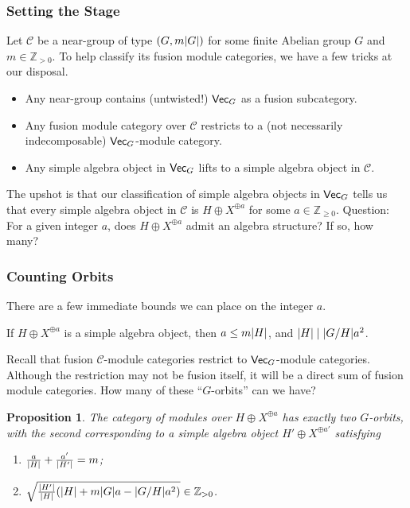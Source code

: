 \documentclass{beamer}
\theoremstyle{plain}
\newtheorem{proposition}[theorem]{Proposition}
\theoremstyle{definition}
\DeclarePairedDelimiter{\abs}{\lvert}{\rvert}
\newcommand{\mathcat}[1]{\mathcal{#1}}
\newcommand{\textcat}[1]{\textup{\textsf{#1}}}
\begin{document}
\begin{frame}
\frametitle{Setting the Stage}
Let $\mathcat{C}$ be a near-group of type $(G, m\abs{G})$ for some finite Abelian group $G$ and $m \in \mathbb{Z}_{>0}$. To help classify its fusion module categories, we have a few tricks at our disposal.
\medskip
\begin{itemize}
	\item Any near-group contains (untwisted!) $\textcat{Vec}_G$ as a fusion subcategory.
	\item Any fusion module category over $\mathcat{C}$ restricts to a (not necessarily indecomposable) $\textcat{Vec}_G$-module category.
	\item Any simple algebra object in $\textcat{Vec}_G$ lifts to a simple algebra object in $\mathcat{C}$.
\end{itemize}
\medskip
The upshot is that our classification of simple algebra objects in $\textcat{Vec}_G$ tells us that every simple algebra object in $\mathcat{C}$ is $H \oplus X^{\oplus a}$ for some $a \in \mathbb{Z}_{\geq 0}$.%
\newline\newline
Question: For a given integer $a$, does $H \oplus X^{\oplus a}$ admit an algebra structure? If so, how many?
\end{frame}

\begin{frame}
\frametitle{Counting Orbits}
There are a few immediate bounds we can place on the integer $a$.
\begin{lemma}
If $H \oplus X^{\oplus a}$ is a simple algebra object, then $a \leq m\abs{H}$, and $\abs{H} \mid \abs{G/H}a^2$.
\end{lemma}
Recall that fusion $\mathcat{C}$-module categories restrict to $\textcat{Vec}_G$-module categories. Although the restriction may not be fusion itself, it will be a direct sum of fusion module categories. How many of these ``$G$-orbits'' can we have?
\begin{proposition}
The category of modules over $H \oplus X^{\oplus a}$ has exactly two $G$-orbits, with the second corresponding to a simple algebra object $H' \oplus X^{\oplus a'}$ satisfying
\begin{enumerate}
\item $\frac{a}{\abs{H}} + \frac{a'}{\abs{H'}} = m$;
\item $\sqrt{\frac{\abs{H'}}{\abs{H}}(\abs{H} + m\abs{G}a - \abs{G/H}a^2)} \in \mathbb{Z}_{>0}$.
\end{enumerate}
\end{proposition}
\end{frame}
\end{document}
